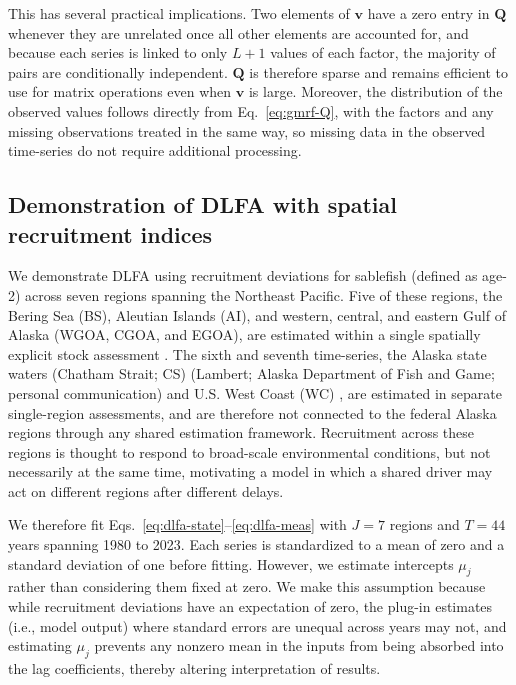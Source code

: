 \documentclass[12pt]{article}
\begin{document}
This has several practical implications. Two elements of $\mathbf{v}$
have a zero entry in $\mathbf{Q}$ whenever they are unrelated once all
other elements are accounted for, and because each series is linked to
only $L+1$ values of each factor, the majority of pairs are
conditionally independent. $\mathbf{Q}$ is therefore sparse and remains
efficient to use for matrix operations even when $\mathbf{v}$ is large.
Moreover, the distribution of the observed values follows directly from
Eq.~\ref{eq:gmrf-Q}, with the factors and any missing observations
treated in the same way, so missing data in the observed time-series do
not require additional processing.

\subsection{Demonstration of DLFA with spatial recruitment indices}
We demonstrate DLFA using recruitment deviations for sablefish (defined
as age-2) across seven regions spanning the Northeast Pacific. Five of
these regions, the Bering Sea (BS), Aleutian Islands (AI), and western,
central, and eastern Gulf of Alaska (WGOA, CGOA, and EGOA), are
estimated within a single spatially explicit stock assessment
\citep{Cheng2025Panmictic}. The sixth and seventh time-series, the
Alaska state waters (Chatham Strait; CS) (Lambert; Alaska Department of
Fish and Game; personal communication) and U.S. West Coast (WC)
\citep{Wetzel2025Sablefish}, are estimated in separate single-region
assessments, and are therefore not connected to the federal Alaska
regions through any shared estimation framework. Recruitment across
these regions is thought to respond to broad-scale environmental
conditions, but not necessarily at the same time, motivating a model in
which a shared driver may act on different regions after different
delays.

We therefore fit Eqs.~\ref{eq:dlfa-state}--\ref{eq:dlfa-meas} with $J =
7$ regions and $T = 44$ years spanning 1980 to 2023. Each series is
standardized to a mean of zero and a standard deviation of one before
fitting. However, we estimate intercepts $\mu_j$ rather than considering
them fixed at zero. We make this assumption because while recruitment
deviations have an expectation of zero, the plug-in estimates (i.e.,
model output) where standard errors are unequal across years may not,
and estimating $\mu_j$ prevents any nonzero mean in the inputs from
being absorbed into the lag coefficients, thereby altering
interpretation of results.
\end{document}
